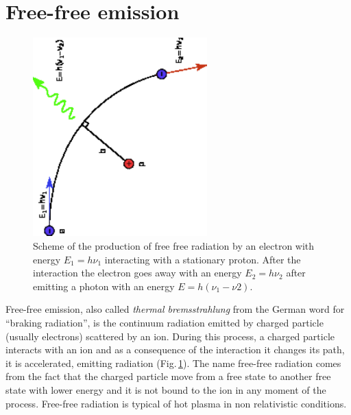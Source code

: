 \documentclass[../thesis.tex]{subfiles}
\begin{document}
\section{Free-free emission}

\begin{figure}
\centering
\includegraphics[width=0.6\textwidth, angle =270]{images/free_free.pdf} 
\caption[]{Scheme of the production of free free radiation by an electron with energy $E_1 = h\nu_1$ interacting with a stationary proton. After the interaction the electron goes away with an energy $E_2=h\nu_2$ after emitting a photon with an energy $E=h(\nu_1-\nu2)$.}
\label{fig:free_free}
\end{figure}

Free-free emission, also called \emph{thermal bremsstrahlung} from the German word for ``braking radiation'', is the continuum radiation emitted by charged particle (usually electrons) scattered by an ion.
During this process, a charged particle interacts with an ion and as a consequence of the interaction it changes its path, it is accelerated, emitting radiation (Fig.\,\ref{fig:free_free}).
The name free-free radiation comes from the fact that the charged particle move from a free state to another free state with lower energy and it is not bound to the ion in any moment of the process.
Free-free radiation is typical of hot plasma in non relativistic conditions.
\end{document}

